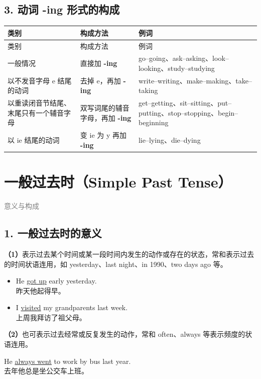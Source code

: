 \documentclass[11pt,a4paper]{ctexart}
\begin{document}
\subsection*{3. 动词 -ing 形式的构成}

{\footnotesize
\begin{longtable}{p{4.47cm}p{4.47cm}p{4.47cm}}
\hline
类别 & 构成方法 & 例词 \\
\hline
\endfirsthead
\hline
类别 & 构成方法 & 例词 \\
\hline
\endhead
\hline
\endfoot
一般情况 & 直接加 \textbf{-ing} & go–going、ask–asking、look–looking、study–studying \\
以不发音字母 e 结尾的动词 & 去掉 e，再加 \textbf{-ing} & write–writing、make–making、take–taking \\
以重读闭音节结尾、末尾只有一个辅音字母 & 双写词尾的辅音字母，再加 \textbf{-ing} & get–getting、sit–sitting、put–putting、stop–stopping、begin–beginning \\
以 ie 结尾的动词 & 变 ie 为 y 再加 \textbf{-ing} & lie–lying、die–dying \\
\end{longtable}
}

\section{一般过去时（Simple Past Tense）}
\noindent\textcolor{gray}{意义与构成}\par\smallskip
\subsection*{1. 一般过去时的意义}

\textbf{（1）}表示过去某个时间或某一段时间内发生的动作或存在的状态，常和表示过去的时间状语连用，如 yesterday、last night、in 1990、two days ago 等。

\begin{itemize}[leftmargin=1.4em]
\item He \underline{got up} early yesterday.\\ 昨天他起得早。
\item I \underline{visited} my grandparents last week.\\ 上周我拜访了祖父母。
\end{itemize}

\textbf{（2）}也可表示过去经常或反复发生的动作，常和 often、always 等表示频度的状语连用。

He \underline{always went} to work by bus last year.\\ 去年他总是坐公交车上班。
\end{document}
